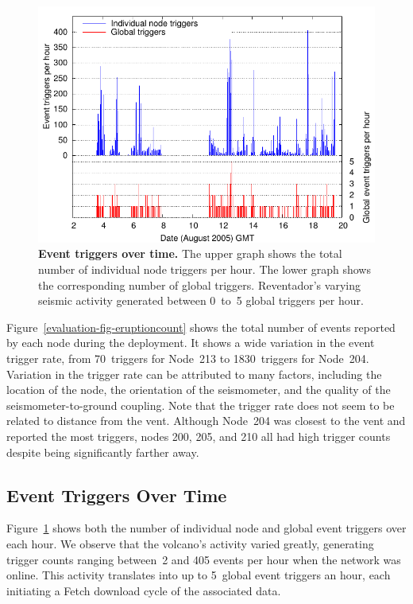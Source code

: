 \begin{figure}[t]
\begin{center}
\includegraphics[width=\hsize]{./3-evaluation/figs/eruptionspertime.pdf}
\end{center}
\caption{\textbf{Event triggers over time.}
The upper graph shows the total number of individual node triggers per hour.
The lower graph shows the corresponding number of global triggers.
Reventador's varying seismic activity generated between 0~to~5 global
triggers per hour.}
\label{evaluation-fig-eruptionspertime}
\end{figure}

Figure~\ref{evaluation-fig-eruptioncount} shows the total number of events
reported by each node during the deployment. It shows a wide variation in the
event trigger rate, from 70~triggers for Node~213 to 1830~triggers for
Node~204. Variation in the trigger rate can be attributed to many factors,
including the location of the node, the orientation of the seismometer, and
the quality of the seismometer-to-ground coupling. Note that the trigger rate
does not seem to be related to distance from the vent. Although Node~204 was
closest to the vent and reported the most triggers, nodes 200, 205, and 210
all had high trigger counts despite being significantly farther away.

\subsection{Event Triggers Over Time}

Figure~\ref{evaluation-fig-eruptionspertime} shows both the number of individual
node and global event triggers over each hour. We observe that the volcano's
activity varied greatly, generating trigger counts ranging between~2 and 405
events per hour when the network was online. This activity translates into up
to 5~global event triggers an hour, each initiating a Fetch download cycle of
the associated data.

